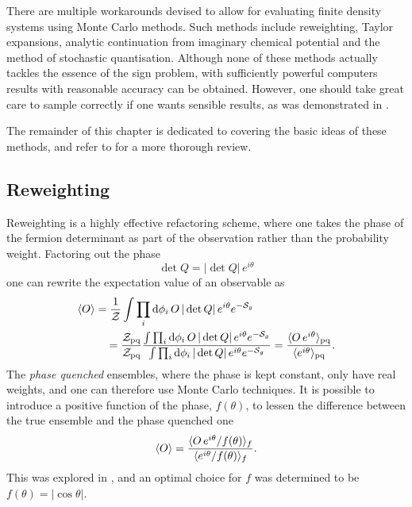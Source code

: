 There are multiple workarounds devised to allow for evaluating finite density
systems using Monte Carlo methods. Such methods include reweighting, Taylor
expansions, analytic continuation from imaginary chemical potential and  the
method of stochastic quantisation. Although none of these methods actually
tackles the essence of the sign problem, with sufficiently powerful computers 
results with reasonable accuracy can be obtained. However, one should take great
care to sample correctly if one wants sensible results, as was demonstrated in
\citep{Osborn:2008eg}.

The remainder of this chapter is dedicated to covering the basic ideas of these
methods, and refer to \citep{deForcrand:2010ys} for a more thorough review.

\subsection{Reweighting}

Reweighting is a highly effective refactoring scheme, where one takes the
phase of the fermion determinant as part of the observation rather than the
probability weight. Factoring out the phase
%
\begin{equation}
  \det Q = |\det Q| \, e^{i\theta}
\end{equation}
%
one can rewrite the expectation value of an observable as
%
\begin{align}
  \langle O \rangle  &=
  \frac{1}{\mathcal{Z}}\int \prod_i \mathrm{d} \phi_i \, O \, | \det
    Q | \, e^{i \theta} e^{-\mathcal{S}_g} \nonumber\\
  & \hskip1em = \frac{\mathcal{Z}_{\text{pq}}}{\mathcal{Z}_{\text{pq}}}
  \frac{\int \prod_i \mathrm{d} \phi_i \, O \, | \det
    Q | \, e^{i \theta} e^{-\mathcal{S}_g}}{%
  \int \prod_i \mathrm{d} \phi_i \, | \det
    Q | \, e^{i \theta} e^{-\mathcal{S}_g}}
  = \frac{\langle O \, e^{i\theta} \rangle_{\text{pq}}}{\langle e^{i\theta} \rangle_{\text{pq}}} .
\end{align}
%
The \emph{phase quenched} ensembles, where the phase is kept constant, only have
real weights, and one can therefore use Monte Carlo techniques. It is
possible to introduce a positive function of the phase, $f(\theta)$, to lessen
the difference between the true ensemble and the phase quenched one
%
\begin{equation}
  \langle O \rangle
  = \frac{\langle O \, e^{i\theta} / f(\theta) \rangle_f}{%
    \langle e^{i\theta} / f(\theta) \rangle_f} .
\end{equation}
%
This was explored in \citep{deForcrand:2002pa}, and an optimal choice for $f$
was determined to be $f(\theta) = |\cos\theta|$.

